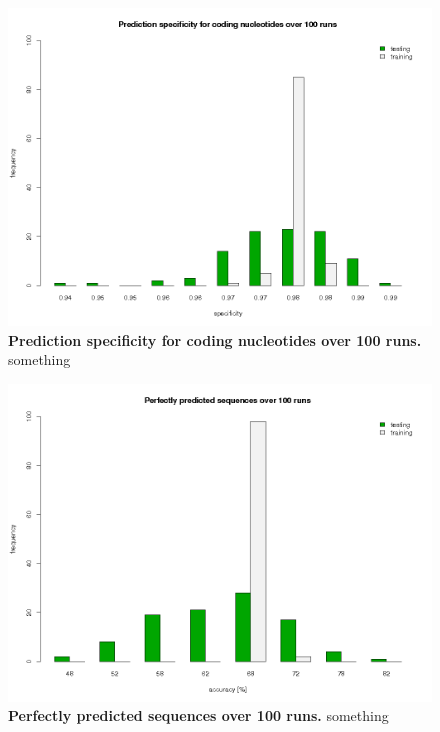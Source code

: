 \begin{figure}[ht]
	\begin{center}
		\includegraphics[scale=0.42]{pics/codingNucleotides_spec.png}
	\caption[Prediction specificity for coding nucleotides over 100 runs]{
	\textbf{Prediction specificity for coding nucleotides over 100 runs.}
	something}
	\end{center}
	\label{fig:codingNucleotides_spec}
\end{figure}

\begin{figure}[ht]
	\begin{center}
		\includegraphics[scale=0.42]{pics/perfect2.png}
	\caption[Perfectly predicted sequences over 100 runs]{
	\textbf{Perfectly predicted sequences over 100 runs.}
	something}
	\end{center}
	\label{fig:perfect2}
\end{figure}

